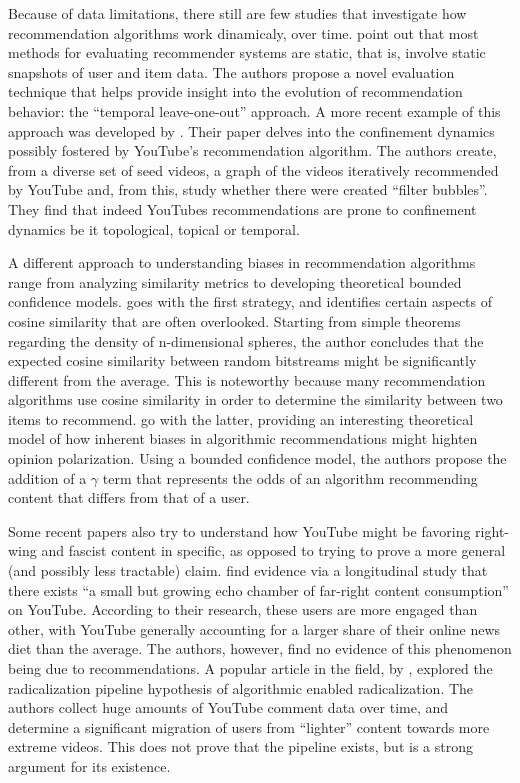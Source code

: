 Because of data limitations, there still are few studies that investigate how
recommendation algorithms work dinamicaly, over time.
\citet{burke_evaluating_2010} point out that most methods for evaluating
recommender systems are static, that is, involve static snapshots of user and
item data. The authors propose a novel evaluation technique that helps provide
insight into the evolution of recommendation behavior: the ``temporal
leave-one-out'' approach. A more recent example of this approach was developed
by \citet{roth_tubes_2020}. Their paper delves into the confinement dynamics
possibly fostered by YouTube's recommendation algorithm. The authors create,
from a diverse set of seed videos, a graph of the videos iteratively recommended
by YouTube and, from this, study whether there were created ``filter bubbles''.
They find that indeed YouTubes recommendations are prone to confinement dynamics
be it topological, topical or temporal.

A different approach to understanding biases in recommendation algorithms range
from analyzing similarity metrics to developing theoretical bounded confidence
models. \citet{giller_statistical_2012} goes with the first strategy, and
identifies certain aspects of cosine similarity that are often overlooked.
Starting from simple theorems regarding the density of n-dimensional spheres,
the author concludes that the expected cosine similarity between random
bitstreams might be significantly different from the average. This is noteworthy
because many recommendation algorithms use cosine similarity in order to
determine the similarity between two items to recommend.
\citet{sirbu_algorithmic_2019} go with the latter, providing an interesting
theoretical model of how inherent biases in algorithmic recommendations might
highten opinion polarization. Using a bounded confidence model, the authors
propose the addition of a $\gamma$ term that represents the odds of an algorithm
recommending content that differs from that of a user.

Some recent papers also try to understand how YouTube might be favoring
right-wing and fascist content in specific, as opposed to trying to prove a more
general (and possibly less tractable) claim.
\citet{hosseinmardi_evaluating_2020} find evidence via a longitudinal study that
there exists ``a small but growing echo chamber of far-right content
consumption'' on YouTube. According to their research, these users are more
engaged than other, with YouTube generally accounting for a larger share of
their online news diet than the average. The authors, however, find no evidence
of this phenomenon being due to recommendations. A popular article in the field,
by \citet{ribeiro_auditing_2020}, explored the radicalization pipeline
hypothesis of algorithmic enabled radicalization. The authors collect huge
amounts of YouTube comment data over time, and determine a significant migration
of users from ``lighter'' content towards more extreme videos. This does not
prove that the pipeline exists, but is a strong argument for its existence.

